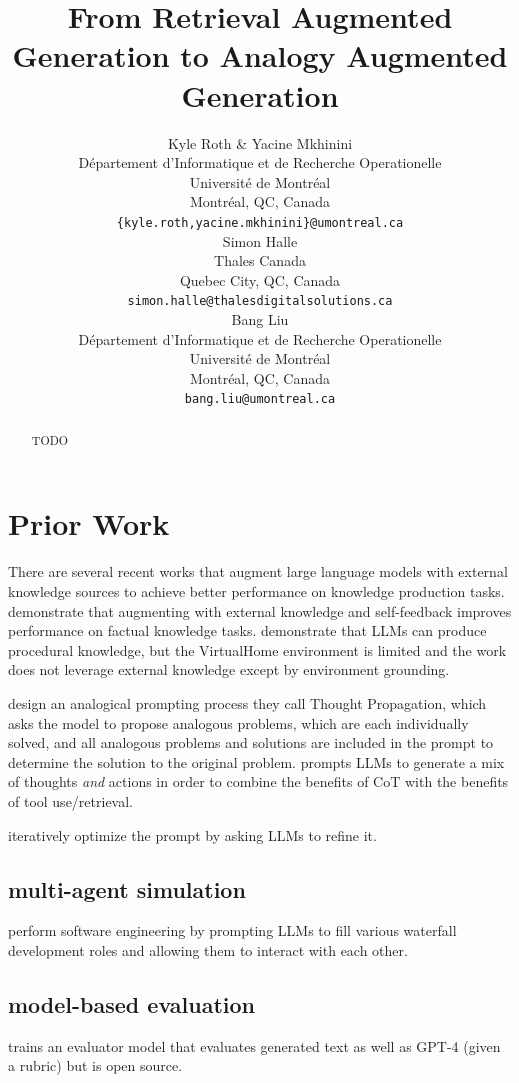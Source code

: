 \documentclass{article}
\title{From Retrieval Augmented Generation to Analogy Augmented Generation}
\author{Kyle Roth \& Yacine Mkhinini \\
D\'epartement d'Informatique et de Recherche Operationelle \\
Universit\'e de Montr\'eal \\
Montr\'eal, QC, Canada \\
\texttt{\{kyle.roth,yacine.mkhinini\}@umontreal.ca} \\
\And
Simon Halle \\
Thales Canada \\
Quebec City, QC, Canada \\
\texttt{simon.halle@thalesdigitalsolutions.ca} \\
\And
Bang Liu \\
D\'epartement d'Informatique et de Recherche Operationelle \\
Universit\'e de Montr\'eal \\
Montr\'eal, QC, Canada \\
\texttt{bang.liu@umontreal.ca}
}
\begin{document}
\maketitle

\begin{abstract}
   TODO
\end{abstract}

\section{Prior Work}

There are several recent works that augment large language models with external knowledge sources to achieve better performance on knowledge production tasks. \cite{checkYourFacts} demonstrate that augmenting with external knowledge and self-feedback improves performance on factual knowledge tasks. \cite{llmsZeroShotPlanners} demonstrate that LLMs can produce procedural knowledge, but the VirtualHome environment is limited and the work does not leverage external knowledge except by environment grounding.

\cite{thoughtPropagation} design an analogical prompting process they call Thought Propagation, which asks the model to propose analogous problems, which are each individually solved, and all analogous problems and solutions are included in the prompt to determine the solution to the original problem. \cite{reAct} prompts LLMs to generate a mix of thoughts \textit{and} actions in order to combine the benefits of CoT with the benefits of tool use/retrieval.

\cite{opro} iteratively optimize the prompt by asking LLMs to refine it.

\subsection{multi-agent simulation}

\cite{qian2023communicative} perform software engineering by prompting LLMs to fill various waterfall development roles and allowing them to interact with each other.

\subsection{model-based evaluation}

\cite{prometheus} trains an evaluator model that evaluates generated text as well as GPT-4 (given a rubric) but is open source.
\end{document}
